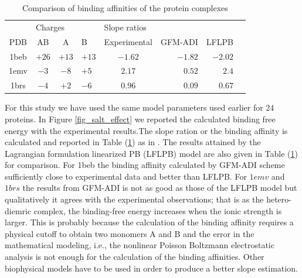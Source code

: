 \begin{table}[!ht]
\begin{center}
\begin{tabular}{ccclcrrr}
\hline
\multicolumn{1}{c}{}           & \multicolumn{3}{l}{Charges} & \multicolumn{3}{l}{Slope ratios} \\
 PDB  & AB    & A     & B      & Experimental & GFM-ADI & LFLPB   \\ \hline
 1beb & $+26$ & $+13$ & $+13$  & $-1.62$      & $-1.82$ & $-2.02$ \\ %
 1emv & $-3$  & $-8$  & $+5$   & $2.17$       & $0.52$  & $2.4$   \\
 1brs & $-4$  & $+2$  & $-6$   & $0.96$		  &	$0.09$ & $0.67$ 	  \\
	 \hline
\end{tabular}
\caption{Comparison of binding affinities of the protein complexes}
\label{tab_salt_effect}
\end{center}
\end{table}

 
For this study we have used the same model parameters used earlier for 24 proteins. In Figure \ref{fig_salt_effect} we reported the calculated binding free energy with the experimental results.The slope ration or the binding affinity is calculated and reported in Table (\ref{tab_salt_effect}) as in \cite{Zhao2011}. The results attained by the Lagrangian formulation linearized PB (LFLPB) model \cite{Zhan2011} are also given in Table (\ref{tab_salt_effect}) for comparison. For 1beb the binding affinity calculated by GFM-ADI scheme sufficiently close to experimental data and better than LFLPB. For $1emv$ and $1brs$ the results from  GFM-ADI is not as good as those of the LFLPB model but qualitatively it agrees with the experimental observations; that is as the hetero-diemric complex, the binding-free energy increases when the ionic strength is larger. This is probably because the calculation of the binding affinity requires a physical cutoff to obtain two monomers A and B and the error in the mathematical modeling, i.e., the nonlinear Poisson Boltzmann electrostatic analysis is not enough for the calculation of the binding affinities. Other biophysical models have to be used in order to produce a better slope estimation. 
   	



